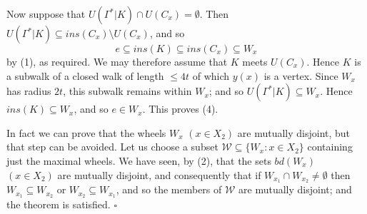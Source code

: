 Now suppose that $U(\Gamma^* | K) \cap U(C_x) = \emptyset$. Then $U(\Gamma^* | K) \subseteq ins(C_x) \setminus U(C_x)$, and so
\begin{equation*}
e \subseteq ins(K) \subseteq ins(C_x) \subseteq W_x
\end{equation*}
by (1), as required. We may therefore assume that $K$ meets $U(C_x)$. Hence $K$ is a subwalk of a closed walk of length $\le 4t$ of which $y(x)$ is a vertex. Since $W_x$ has radius $2t$, this subwalk remains within $W_x$; and so $U(\Gamma^* | K) \subseteq W_x$. Hence $ins(K) \subseteq W_x$, and so $e \in W_x$. This proves (4).

In fact we can prove that the wheels $W_x$ $(x \in X_2)$ are mutually disjoint, but that step can be avoided. Let us choose a subset $\mathscr{W} \subseteq \{W_x : x \in X_2\}$ containing just the maximal wheels. We have seen, by (2), that the sets $bd(W_x)$ $(x \in X_2)$ are mutually disjoint, and consequently that if $W_{x_1} \cap W_{x_2} \ne \emptyset$ then $W_{x_1} \subseteq W_{x_2}$ or $W_{x_2} \subseteq W_{x_1}$, and so the members of $\mathscr{W}$ are mutually disjoint; and the theorem is satisfied. $\square$
